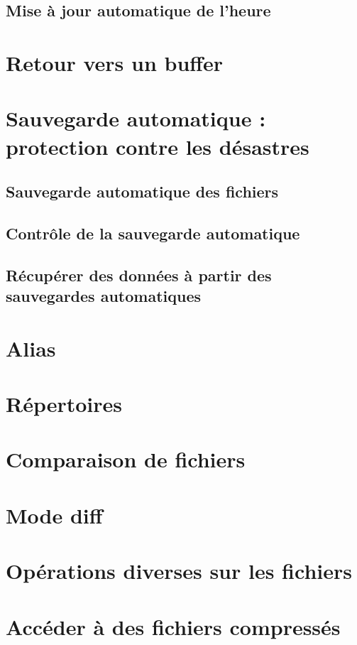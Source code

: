 \subsection{Mise à jour automatique de l'heure}\label{chap15sec3subsec6}
\section{Retour vers un buffer}\label{chap15sec4}
\section{Sauvegarde automatique : protection contre les
  désastres}\label{chap15sec5} 
\subsection{Sauvegarde automatique des fichiers}\label{chap15sec5subsec1}
\subsection{Contrôle de la sauvegarde automatique}\label{chap15sec5subsec2}
\subsection{Récupérer des données à partir des sauvegardes
  automatiques}\label{chap15sec5subsec3}
\section{Alias}\label{chap15sec6}
\section{Répertoires}\label{chap15sec7}
\section{Comparaison de fichiers}\label{chap15sec8}
\section{Mode diff}\label{chap15sec9}
\section{Opérations diverses sur les fichiers}\label{chap15sec10}
\section{Accéder à des fichiers compressés}\label{chap15sec11}
